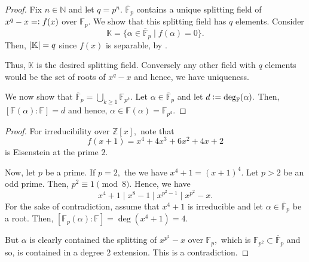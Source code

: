 \existencefinfields*\label{thm:existencefinfields2}
\begin{flushright}\hyperref[thm:existencefinfields]{\upsym}\end{flushright}
\begin{proof}
    Fix $n \in \mathbb{N}$ and let $q = p^n.$ $\overline{\mathbb{F}}_p$ contains a unique splitting field of $x^q - x =\vcentcolon f(x)$ over $\mathbb{F}_p.$ We show that this splitting field has $q$ elements. Consider
    \begin{equation*} 
        \mathbb{K} = \{\alpha \in \overline{\mathbb{F}}_p \mid f(\alpha) = 0\}.
    \end{equation*}
    Then, ${\left\lvert \mathbb{K} \right\lvert} = q$ since $f(x)$ is separable, by . 

    Thus, $\mathbb{K}$ is the desired splitting field. Conversely any other field with $q$ elements would be the set of roots of $x^q - x$ and hence, we have uniqueness.

    We now show that $\overline{\mathbb{F}}_p = \bigcup_{k \ge 1}\mathbb{F}_{p^k}.$ Let $\alpha \in \overline{\mathbb{F}}_p$ and let $d \vcentcolon= \deg_{\mathbb{F}}(\alpha).$ Then, $[\mathbb{F}(\alpha) : \mathbb{F}] = d$ and hence, $\alpha \in \mathbb{F}(\alpha) = \mathbb{F}_{p^d}.$
\end{proof}


\xfourplusone*\label{prop:xfourplusone2}
\begin{flushright}\hyperref[prop:xfourplusone]{\upsym}\end{flushright}
\begin{proof}
    For irreducibility over $\mathbb{Z}[x],$ note that
    \begin{equation*} 
        f(x + 1) = x^4 + 4x^3 + 6x^2 + 4x + 2
    \end{equation*}
    is Eisenstein at the prime $2.$

    Now, let $p$ be a prime. If $p = 2,$ the we have $x^4 + 1 = (x + 1)^4.$ Let $p > 2$ be an odd prime. Then, $p^2 \equiv 1 \pmod{8}.$ Hence, we have
    \begin{equation*} 
        x^4 + 1 \mid x^8 - 1 \mid x^{p^2 - 1} \mid x^{p^2} - x.
    \end{equation*}
    For the sake of contradiction, assume that $x^4 + 1$ is irreducible and let $\alpha \in \overline{\mathbb{F}}_p$ be a root. Then, $[\mathbb{F}_p(\alpha) : \mathbb{F}] = \deg(x^4 + 1) = 4.$

    But $\alpha$ is clearly contained the splitting of $x^{p^2} - x$ over $\mathbb{F}_p,$ which is $\mathbb{F}_{p^2} \subset \overline{\mathbb{F}}_p$ and so, is contained in a degree $2$ extension. This is a contradiction.
\end{proof}

